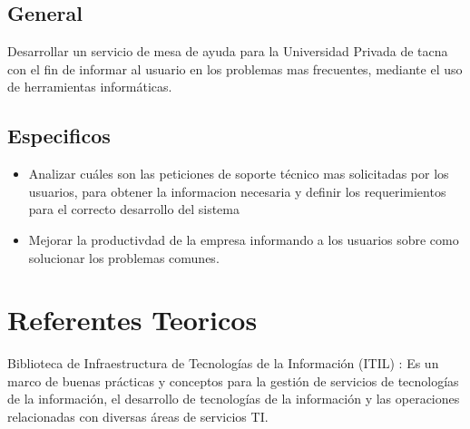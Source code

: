 \documentclass[preprint,12pt]{elsarticle}
\begin{document}


\subsection{\textbf{General}}

Desarrollar un servicio de mesa de ayuda para la Universidad Privada de tacna con el fin de informar al usuario en los problemas mas frecuentes, mediante el uso de herramientas informáticas.


\subsection{\textbf{Especificos}}

\begin{itemize}

\item Analizar cuáles son las peticiones de soporte técnico mas solicitadas por los usuarios, para obtener la informacion necesaria y definir los requerimientos para el correcto desarrollo del sistema
\item Mejorar la productivdad de la empresa informando a los usuarios sobre como solucionar los problemas comunes.
\end{itemize}


 


\section{Referentes Teoricos}
Biblioteca de Infraestructura de Tecnologías de la Información (ITIL) : Es un marco de buenas prácticas y conceptos para la gestión de servicios de tecnologías de la información, el desarrollo de tecnologías de la información y las operaciones relacionadas con diversas áreas de servicios TI.
\end{document}

